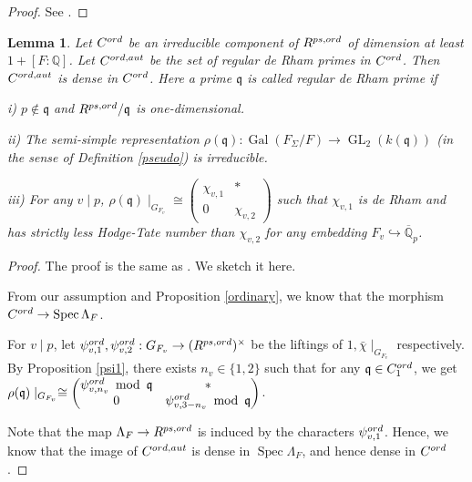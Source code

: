 \documentclass[12pt]{amsart}
\theoremstyle{plain}
\newtheorem{lem}[thm]{Lemma}
\theoremstyle{definition}
\theoremstyle{remark}
\begin{document}
\begin{proof}
	See \cite[Theorem 5.1.1]{pan2022fontaine}.
\end{proof}

\begin{lem}\label{dense}
	Let $C^{\textnormal{ord}}$ be an irreducible component of $ R^{\textnormal{ps,ord}}$ of dimension at least $1+[F: \mathbb{Q}]$.
	 Let $ C^{\textnormal{ord,aut}}$ be the set of regular de Rham primes in $C^{\textnormal{ord}}$. Then $C^{\textnormal{ord,aut}} $ is dense in $C^{\textnormal{ord}}$. Here a prime $\mathfrak{q}$ is called regular de Rham prime if
	
	\quad i) $p \notin \mathfrak{q}$ and $R^{\textnormal{ps,ord}}/\mathfrak{q} $ is one-dimensional.
	
	\quad ii) The semi-simple representation $\rho(\mathfrak{q}): \operatorname{Gal}(F_{\Sigma}/F) \to \operatorname{GL}_2(k(\mathfrak{q}))$ (in the sense of Definition \ref{pseudo}) is irreducible.
	
	\quad iii) For any $v \mid p$, $\rho(\mathfrak{q}) \mid_{G_{F_v}} \cong  \begin{pmatrix}
		\chi_{v,1} & *\\
		0 & \chi_{v,2}
	\end{pmatrix}$ such that $\chi_{v,1} $ is de Rham and has strictly less Hodge-Tate number than $\chi_{v,2} $ for any embedding $F_v \hookrightarrow \overline{\mathbb{Q}}_p$.
\end{lem}

\begin{proof}
	The proof is the same as \cite[Corollary 7.2.3]{pan2022fontaine}. We sketch it here.
	
	From our assumption and Proposition \ref{ordinary}, we know that the morphism $C^{\textnormal{ord}} \to \operatorname{Spec} \Lambda_F$. 
	
	  For $v \mid p$, let $ \psi_{v,1}^{\textnormal{ord}}, \psi_{v,2}^{\textnormal{ord}}: G_{F_v} \to (R^{\textnormal{ps,ord}})^\times$ be the liftings of $1, \bar{\chi}\mid_{G_{F_v}}$ respectively. By Proposition \ref{psi1}, there exists $n_v \in \{1,2\}$ such that for any $\mathfrak{q} \in C_1^{\textnormal{ord}}$, we get $\rho(\mathfrak{q}) \mid_{G_{F_v}} \cong  \begin{pmatrix}
		\psi_{v,n_v}^{\textnormal{ord}} ~\operatorname{mod}~\mathfrak{q}& *\\
		0 & \psi_{v,3-n_v}^{\textnormal{ord}}~\operatorname{mod}~\mathfrak{q}
	\end{pmatrix}$. 
	
	Note that the map $\Lambda_F \to R^{\textnormal{ps,ord}} $ is induced by the characters $ \psi_{v,1}^{\textnormal{ord}}$. Hence, we know that the image of $ C^{\textnormal{ord,aut}}$ is dense in $\operatorname{Spec} \Lambda_F$, and hence dense in $C^{\textnormal{ord}}$.
\end{proof}
\end{document}
